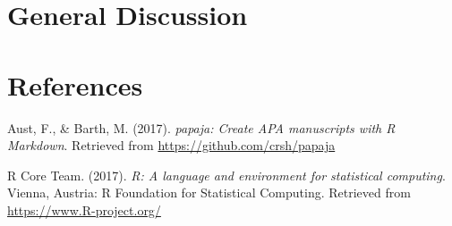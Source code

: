 \documentclass[floatsintext,man]{apa6}
\theoremstyle{definition}
\theoremstyle{definition}
\theoremstyle{definition}
\theoremstyle{remark}
\begin{document}
\section{General Discussion}\label{general-discussion}

\newpage

\section{References}\label{references}

\begingroup
\setlength{\parindent}{-0.5in} \setlength{\leftskip}{0.5in}

\hypertarget{refs}{}
\hypertarget{ref-R-papaja}{}
Aust, F., \& Barth, M. (2017). \emph{papaja: Create APA manuscripts with
R Markdown}. Retrieved from \url{https://github.com/crsh/papaja}

\hypertarget{ref-R-base}{}
R Core Team. (2017). \emph{R: A language and environment for statistical
computing}. Vienna, Austria: R Foundation for Statistical Computing.
Retrieved from \url{https://www.R-project.org/}

\endgroup
\end{document}
